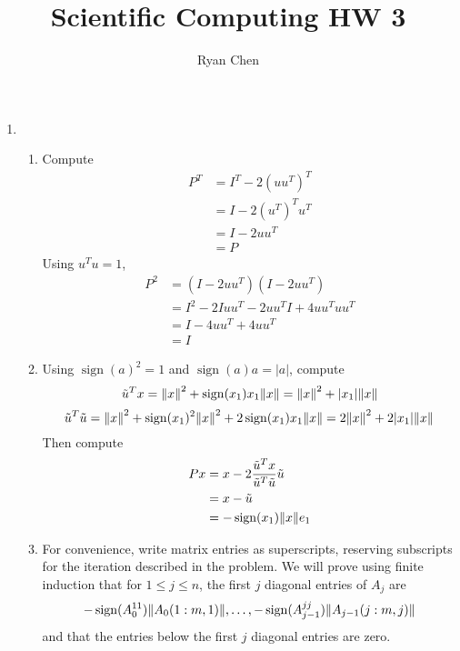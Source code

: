 \documentclass{article}
\title{Scientific Computing HW 3}
\author{Ryan Chen}
\DeclareMathOperator{\sign}{sign}
\renewcommand{\u}{\tilde{u}}
\begin{document}
	
\maketitle



\begin{enumerate}
	
	
	
	\item 
	
	\begin{enumerate}
		
		
		
		\item Compute
		\begin{align*}
			P^T &= I^T - 2(uu^T)^T \\
			&= I - 2(u^T)^Tu^T \\
			&= I - 2uu^T \\
			&= P
		\end{align*}
		Using $u^Tu=1$,
		\begin{align*}
			P^2 &= (I - 2uu^T)(I - 2uu^T) \\
			&= I^2 - 2Iuu^T - 2uu^TI + 4uu^Tuu^T \\
			&= I - 4uu^T + 4uu^T \\
			&= I
		\end{align*}
		
		
		
		\item Using $\sign(a)^2=1$ and $\sign(a)a=|a|$, compute
		\[\u^Tx = \norm{x}^2 + \sign(x_1)x_1\norm{x} = \norm{x}^2 + |x_1|\norm{x}\]
		\[\u^T\u = \norm{x}^2 + \sign(x_1)^2\norm{x}^2 + 2\sign(x_1)x_1\norm{x} = 2\norm{x}^2 + 2|x_1|\norm{x}\]
		Then compute
		\begin{align*}
			Px &= x - 2\frac{\u^Tx}{\u^T\u}\u \\
			&= x - \u \\
			&= -\sign(x_1)\norm{x}e_1
		\end{align*}
		
		
		
		\item For convenience, write matrix entries as superscripts, reserving subscripts for the iteration described in the problem. We will prove using finite induction that for $1\le j\le n$, the first $j$ diagonal entries of $A_{j}$ are
		\[-\sign(A_0^{11})\norm{A_0(1:m,1)}, \dots, -\sign(A_{j-1}^{jj})\norm{A_{j-1}(j:m,j)}\]
		and that the entries below the first $j$ diagonal entries are zero.
		

\end{enumerate}
\end{enumerate}
\end{document}
